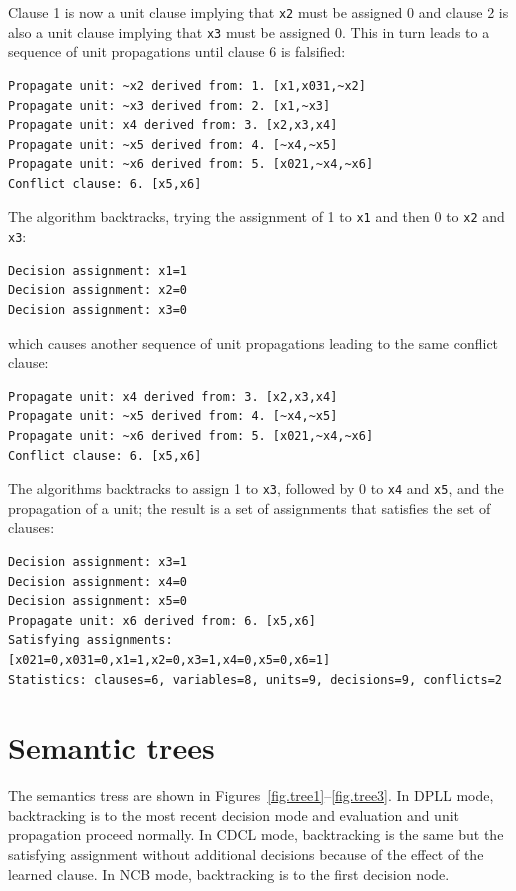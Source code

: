 \documentclass[11pt]{report}
\newcommand*{\p}[1]{\textup{\texttt{#1}}}
\begin{document}
Clause 1 is now a unit clause implying that \p{x2} must be assigned 0
and clause 2 is also a unit clause implying that \p{x3} must be assigned
0. This in turn leads to a sequence of unit propagations until clause 6
is falsified:

\begin{verbatim}
Propagate unit: ~x2 derived from: 1. [x1,x031,~x2]
Propagate unit: ~x3 derived from: 2. [x1,~x3]
Propagate unit: x4 derived from: 3. [x2,x3,x4]
Propagate unit: ~x5 derived from: 4. [~x4,~x5]
Propagate unit: ~x6 derived from: 5. [x021,~x4,~x6]
Conflict clause: 6. [x5,x6]
\end{verbatim}

\pagebreak[3]

The algorithm backtracks, trying the assignment of 1 to \p{x1} and then
0 to \p{x2} and \p{x3}:
\begin{verbatim}
Decision assignment: x1=1
Decision assignment: x2=0
Decision assignment: x3=0
\end{verbatim}
which causes another sequence of unit propagations leading to the same
conflict clause:
\begin{verbatim}
Propagate unit: x4 derived from: 3. [x2,x3,x4]
Propagate unit: ~x5 derived from: 4. [~x4,~x5]
Propagate unit: ~x6 derived from: 5. [x021,~x4,~x6]
Conflict clause: 6. [x5,x6]
\end{verbatim}

The algorithms backtracks to assign 1 to \p{x3}, followed by 0 to \p{x4}
and \p{x5}, and the propagation of a unit; the result is a set of
assignments that satisfies the set of clauses:
\begin{verbatim}
Decision assignment: x3=1
Decision assignment: x4=0
Decision assignment: x5=0
Propagate unit: x6 derived from: 6. [x5,x6]
Satisfying assignments:
[x021=0,x031=0,x1=1,x2=0,x3=1,x4=0,x5=0,x6=1]
Statistics: clauses=6, variables=8, units=9, decisions=9, conflicts=2
\end{verbatim}

\section{Semantic trees}

The semantics tress are shown in
Figures~\ref{fig.tree1}--\ref{fig.tree3}. In DPLL mode, backtracking is
to the most recent decision mode and evaluation and unit propagation
proceed normally. In CDCL mode, backtracking is the same but the
satisfying assignment without additional decisions because of the effect
of the learned clause. In NCB mode, backtracking is to the first
decision node.
\end{document}
